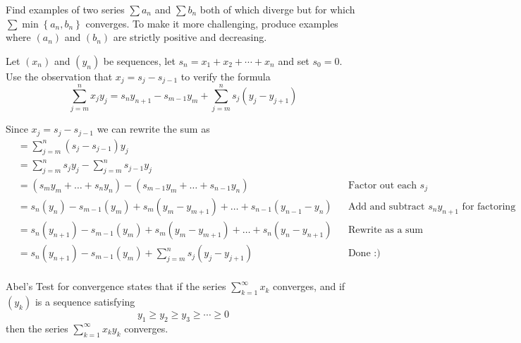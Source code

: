 \begin{exercise}
  Find examples of two series $\sum a_{n}$ and $\sum b_{n}$ both of which diverge but for which $\sum \min \left\{a_{n}, b_{n}\right\}$ converges. To make it more challenging, produce examples where $\left(a_{n}\right)$ and $\left(b_{n}\right)$ are strictly positive and decreasing.
\end{exercise}

\begin{solution}
  \TODO
\end{solution}

\begin{exercise}
  Let $\left(x_{n}\right)$ and $\left(y_{n}\right)$ be sequences, let $s_{n}=x_{1}+x_{2}+\cdots+x_{n}$ and set $s_{0}=0 .$ Use the observation that $x_{j}=s_{j}-s_{j-1}$ to verify the formula
  $$
  \sum_{j=m}^{n} x_{j} y_{j}=s_{n} y_{n+1}-s_{m-1} y_{m}+\sum_{j=m}^{n} s_{j}\left(y_{j}-y_{j+1}\right)
  $$
\end{exercise}

\begin{solution}
  Since $x_j = s_j - s_{j-1}$ we can rewrite the sum as
  $$
  \begin{aligned}
    &= \sum_{j=m}^n (s_j - s_{j-1})y_j \\
    &= \sum_{j=m}^n s_j y_j - \sum_{j=m}^n s_{j-1} y_j \\
    &= (s_my_m + \dots + s_ny_n) - (s_{m-1}y_m + \dots + s_{n-1}y_n)                  &&\text{Factor out each } s_j\\
    &= s_n(y_n) - s_{m-1}(y_m) + s_m(y_m - y_{m+1}) + \dots + s_{n-1}(y_{n-1} - y_n)  &&\text{Add and subtract } s_ny_{n+1} \text{ for factoring} \\
    &= s_n(y_{n+1}) - s_{m-1}(y_m) + s_m(y_m - y_{m+1}) + \dots + s_n(y_n - y_{n+1})  &&\text{Rewrite as a sum} \\
    &= s_n(y_{n+1}) - s_{m-1}(y_m) + \sum_{j=m}^n s_j(y_j - y_{j+1})                  &&\text{Done :)} \\
  \end{aligned}
  $$
\end{solution}

\begin{exercise}
  Abel's Test for convergence states that if the series $\sum_{k=1}^{\infty} x_{k}$ converges, and if $\left(y_{k}\right)$ is a sequence satisfying
  $$
  y_{1} \geq y_{2} \geq y_{3} \geq \cdots \geq 0
  $$
  then the series $\sum_{k=1}^{\infty} x_{k} y_{k}$ converges.
\end{exercise}


